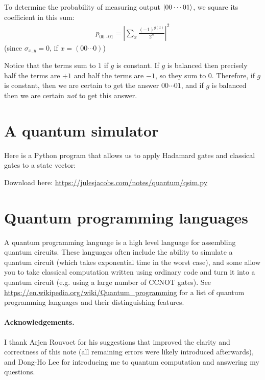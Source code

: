 To determine the probability of measuring output $\ket{00\cdots01}$, we square its coefficient in this sum:
\begin{align*}
  p_{00\cdots01} =\left|\sum_x \frac{(-1)^{g(x)}}{2^n}\right|^2
\end{align*}
(since $\sigma_{x,y} = 0$, if $x = (00\cdots0)$)

Notice that the terms sum to $1$ if $g$ is constant. If $g$ is balanced then precisely half the terms are $+1$ and half the terms are $-1$, so they sum to $0$.
Therefore, if $g$ is constant, then we are certain to get the answer $00\cdots01$, and if $g$ is balanced then we are certain \emph{not} to get this answer.

\section{A quantum simulator}

Here is a Python program that allows us to apply Hadamard gates and classical gates to a state vector:\bigskip


Download here: \url{https://julesjacobs.com/notes/quantum/qsim.py}

\section{Quantum programming languages}

A quantum programming language is a high level language for assembling quantum circuits.
These languages often include the ability to simulate a quantum circuit (which takes exponential time in the worst case),
and some allow you to take classical computation written using ordinary code and turn it into a quantum circuit (e.g. using a large number of CCNOT gates).
See \url{https://en.wikipedia.org/wiki/Quantum_programming} for a list of quantum programming languages and their distinguishing features.

\paragraph{Acknowledgements.}
I thank Arjen Rouvoet for his suggestions that improved the clarity and correctness of this note (all remaining errors were likely introduced afterwards),
and Dong-Ho Lee for introducing me to quantum computation and answering my questions.






